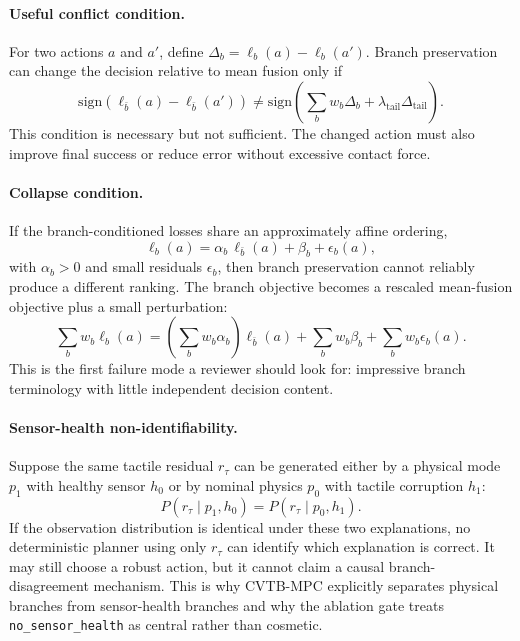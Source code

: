 \documentclass{article}
\newcommand{\method}{\textsc{CVTB-MPC}}
\newcommand{\act}{a}
\begin{document}
\paragraph{Useful conflict condition.}
For two actions $a$ and $a'$, define $\Delta_b=\ell_b(a)-\ell_b(a')$. Branch preservation can change the decision relative to mean fusion only if
\begin{equation}
  \mathrm{sign}\left(\ell_{\bar b}(a)-\ell_{\bar b}(a')\right)
  \neq
  \mathrm{sign}\left(\sum_b w_b\Delta_b+\lambda_{\mathrm{tail}}\Delta_{\mathrm{tail}}\right).
\end{equation}
This condition is necessary but not sufficient. The changed action must also improve final success or reduce error without excessive contact force.

\paragraph{Collapse condition.}
If the branch-conditioned losses share an approximately affine ordering,
\begin{equation}
  \ell_b(\act)=\alpha_b\,\ell_{\bar b}(\act)+\beta_b+\epsilon_b(\act),
\end{equation}
with $\alpha_b>0$ and small residuals $\epsilon_b$, then branch preservation cannot reliably produce a different ranking. The branch objective becomes a rescaled mean-fusion objective plus a small perturbation:
\begin{equation}
  \sum_b w_b\ell_b(\act) =
  \left(\sum_b w_b\alpha_b\right)\ell_{\bar b}(\act)
  + \sum_b w_b\beta_b
  + \sum_b w_b\epsilon_b(\act).
\end{equation}
This is the first failure mode a reviewer should look for: impressive branch terminology with little independent decision content.

\paragraph{Sensor-health non-identifiability.}
Suppose the same tactile residual $r_\tau$ can be generated either by a physical mode $p_1$ with healthy sensor $h_0$ or by nominal physics $p_0$ with tactile corruption $h_1$:
\begin{equation}
  P(r_\tau\mid p_1,h_0)=P(r_\tau\mid p_0,h_1).
\end{equation}
If the observation distribution is identical under these two explanations, no deterministic planner using only $r_\tau$ can identify which explanation is correct. It may still choose a robust action, but it cannot claim a causal branch-disagreement mechanism. This is why \method{} explicitly separates physical branches from sensor-health branches and why the ablation gate treats \texttt{no\_sensor\_health} as central rather than cosmetic.
\end{document}
